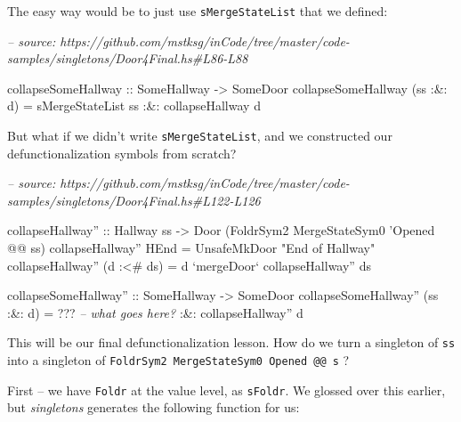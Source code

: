 \documentclass[]{article}
\newenvironment{Shaded}{}{}
\newcommand{\CommentTok}[1]{\textcolor[rgb]{0.38,0.63,0.69}{\textit{#1}}}
\newcommand{\DataTypeTok}[1]{\textcolor[rgb]{0.56,0.13,0.00}{#1}}
\newcommand{\FunctionTok}[1]{\textcolor[rgb]{0.02,0.16,0.49}{#1}}
\newcommand{\NormalTok}[1]{#1}
\newcommand{\OtherTok}[1]{\textcolor[rgb]{0.00,0.44,0.13}{#1}}
\newcommand{\StringTok}[1]{\textcolor[rgb]{0.25,0.44,0.63}{#1}}
\begin{document}
The easy way would be to just use \texttt{sMergeStateList} that we defined:

\begin{Shaded}
\begin{Highlighting}[]
\CommentTok{-- source: https://github.com/mstksg/inCode/tree/master/code-samples/singletons/Door4Final.hs#L86-L88}

\OtherTok{collapseSomeHallway ::} \DataTypeTok{SomeHallway} \OtherTok{->} \DataTypeTok{SomeDoor}
\NormalTok{collapseSomeHallway (ss }\FunctionTok{:&:}\NormalTok{ d) }\FunctionTok{=}\NormalTok{ sMergeStateList ss}
                             \FunctionTok{:&:}\NormalTok{ collapseHallway d}
\end{Highlighting}
\end{Shaded}

But what if we didn't write \texttt{sMergeStateList}, and we constructed our
defunctionalization symbols from scratch?

\begin{Shaded}
\begin{Highlighting}[]
\CommentTok{-- source: https://github.com/mstksg/inCode/tree/master/code-samples/singletons/Door4Final.hs#L122-L126}

\NormalTok{collapseHallway''}
\OtherTok{    ::} \DataTypeTok{Hallway}\NormalTok{ ss}
    \OtherTok{->} \DataTypeTok{Door}\NormalTok{ (}\DataTypeTok{FoldrSym2} \DataTypeTok{MergeStateSym0}\NormalTok{ '}\DataTypeTok{Opened} \FunctionTok{@@}\NormalTok{ ss)}
\NormalTok{collapseHallway'' }\DataTypeTok{HEnd}       \FunctionTok{=} \DataTypeTok{UnsafeMkDoor} \StringTok{"End of Hallway"}
\NormalTok{collapseHallway'' (d }\FunctionTok{:<#}\NormalTok{ ds) }\FunctionTok{=}\NormalTok{ d }\OtherTok{`mergeDoor`}\NormalTok{ collapseHallway'' ds}

\OtherTok{collapseSomeHallway'' ::} \DataTypeTok{SomeHallway} \OtherTok{->} \DataTypeTok{SomeDoor}
\NormalTok{collapseSomeHallway'' (ss }\FunctionTok{:&:}\NormalTok{ d) }\FunctionTok{=} \FunctionTok{???}    \CommentTok{-- what goes here?}
                               \FunctionTok{:&:}\NormalTok{ collapseHallway'' d}
\end{Highlighting}
\end{Shaded}

This will be our final defunctionalization lesson. How do we turn a singleton of
\texttt{ss} into a singleton of
\texttt{FoldrSym2\ MergeStateSym0\ \textquotesingle{}Opened\ @@\ s} ?

First -- we have \texttt{Foldr} at the value level, as \texttt{sFoldr}. We
glossed over this earlier, but \emph{singletons} generates the following
function for us:
\end{document}
